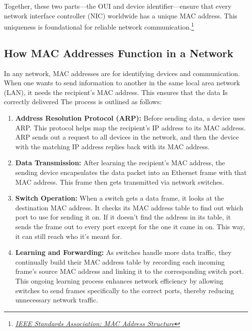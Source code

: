 \documentclass[11pt,a4paper]{article}
\begin{document}
Together, these two parts—the OUI and device identifier—ensure that every network interface controller (NIC) worldwide has a unique MAC address. This uniqueness is foundational for reliable network communication.\footnote{\href{https://standards.ieee.org/products-programs/regauth/mac.html}{\textit{IEEE Standards Association: MAC Address Structure}}}

\subsection*{How MAC Addresses Function in a Network}

In any network, MAC addresses are for identifying devices and communication. When one wants to send information to another in the same local area network (LAN), it needs the recipient's MAC address. This ensures that the data Is correctly delivered The process is outlined as follows:

\begin{enumerate}
    
    \item \textbf{Address Resolution Protocol (ARP):} Before sending data, a device uses ARP. This protocol helps map the recipient's IP address to its MAC address. ARP sends out a request to all devices in the network, and then the device with the matching IP address replies back with its MAC address.

    \item \textbf{Data Transmission:} After learning the recipient’s MAC address, the sending device encapsulates the data packet into an Ethernet frame with that MAC address. This frame then gets transmitted via network switches.

    \item \textbf{Switch Operation:} When a switch gets a data frame, it looks at the destination MAC address. It checks its MAC address table to find out which port to use for sending it on. If it doesn't find the address in its table, it sends the frame out to every port except for the one it came in on. This way, it can still reach who it's meant for.


    \item \textbf{Learning and Forwarding:} As switches handle more data traffic, they continually build their MAC address table by recording each incoming frame’s source MAC address and linking it to the corresponding switch port. This ongoing learning process enhances network efficiency by allowing switches to send frames specifically to the correct ports, thereby reducing unnecessary network traffic.

\end{enumerate}
\end{document}
